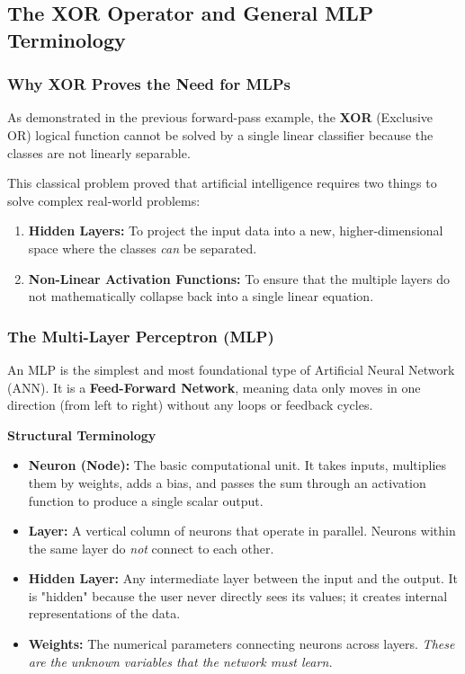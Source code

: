 \documentclass[11pt]{article}
\theoremstyle{smallexample}
\newcommand{\vs}{\vspace{0.2\baselineskip}}
\begin{document}
\subsection{The XOR Operator and General MLP Terminology}

\subsubsection{Why XOR Proves the Need for MLPs}
As demonstrated in the previous forward-pass example, the \textbf{XOR} (Exclusive OR) logical function cannot be solved by a single linear classifier because the classes are not linearly separable. 

This classical problem proved that artificial intelligence requires two things to solve complex real-world problems:
\begin{enumerate}
    \item \textbf{Hidden Layers:} To project the input data into a new, higher-dimensional space where the classes \textit{can} be separated.
    \item \textbf{Non-Linear Activation Functions:} To ensure that the multiple layers do not mathematically collapse back into a single linear equation.
\end{enumerate}

\subsubsection{The Multi-Layer Perceptron (MLP)}
An MLP is the simplest and most foundational type of Artificial Neural Network (ANN). It is a \textbf{Feed-Forward Network}, meaning data only moves in one direction (from left to right) without any loops or feedback cycles.

\vs
\textbf{Structural Terminology}
\begin{itemize}
    \item \textbf{Neuron (Node):} The basic computational unit. It takes inputs, multiplies them by weights, adds a bias, and passes the sum through an activation function to produce a single scalar output.
    \item \textbf{Layer:} A vertical column of neurons that operate in parallel. Neurons within the same layer do \textit{not} connect to each other.
    \item \textbf{Hidden Layer:} Any intermediate layer between the input and the output. It is "hidden" because the user never directly sees its values; it creates internal representations of the data.
    \item \textbf{Weights:} The numerical parameters connecting neurons across layers. \textit{These are the unknown variables that the network must learn.}
\end{itemize}
\end{document}
